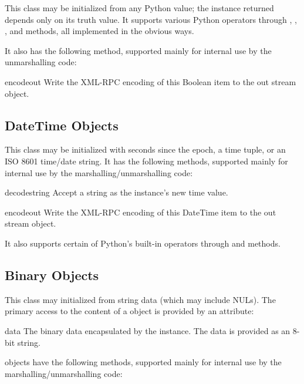 This class may be initialized from any Python value; the instance
returned depends only on its truth value.  It supports various Python
operators through , ,
, and  methods, all
implemented in the obvious ways.

It also has the following method, supported mainly for internal use by
the unmarshalling code:

\begin{methoddesc}{encode}{out}
Write the XML-RPC encoding of this Boolean item to the out stream object.
\end{methoddesc}


\subsection{DateTime Objects \label{datetime-objects}}

This class may be initialized with seconds since the epoch, a
time tuple, or an ISO 8601 time/date string.  It has the following
methods, supported mainly for internal use by the
marshalling/unmarshalling code:

\begin{methoddesc}{decode}{string}
Accept a string as the instance's new time value.
\end{methoddesc}

\begin{methoddesc}{encode}{out}
Write the XML-RPC encoding of this DateTime item to the out stream object.
\end{methoddesc}

It also supports certain of Python's built-in operators through 
 and  methods.


\subsection{Binary Objects \label{binary-objects}}

This class may initialized from string data (which may include NULs).
The primary access to the content of a  object is
provided by an attribute:

\begin{memberdesc}[Binary]{data}
The binary data encapsulated by the  instance.  The data
is provided as an 8-bit string.
\end{memberdesc}

 objects have the following methods, supported mainly
for internal use by the marshalling/unmarshalling code:

